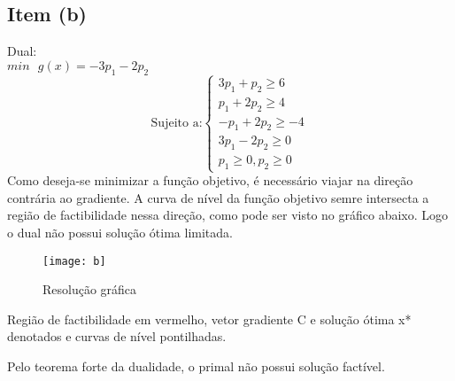 \documentclass[a4paper, 12pt]{article}
\begin{document}
\subsection{Item (b)}
Dual:\\
$min\text{ }g(x)=-3p_1-2p_2$
\[
\text{Sujeito a:}\left\{
\begin{array}{l}
3p_1+p_2\geq6\\
p_1+2p_2\geq4\\
-p_1+2p_2\geq-4\\
3p_1-2p_2\geq0\\
p_1\geq 0, p_2\geq 0
\end{array}
\right.
\]
Como deseja-se minimizar a função objetivo, é necessário viajar na direção contrária ao gradiente. A curva de nível da função objetivo semre intersecta a região de factibilidade nessa direção, como pode ser visto no gráfico abaixo. Logo o dual não possui solução ótima limitada.
\begin{table}[H]
\centering
\begin{figure}[H]
    \centering
    \caption{\label{fig:1} Resolução gráfica}
    \texttt{[image: b]}
\end{figure}
\small
Região de factibilidade em vermelho, vetor gradiente C e solução ótima x* denotados e curvas de nível pontilhadas.
\end{table}
Pelo teorema forte da dualidade, o primal não possui solução factível.
\end{document}
